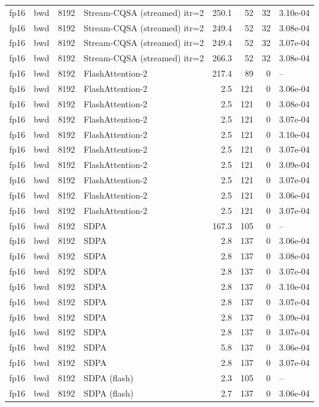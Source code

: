 \begin{tabular}{llrlrrrl}
fp16 & bwd & 8192 & Stream-CQSA (streamed) itr=2 & 250.1 & 52 & 32 & 3.10e-04 \\
fp16 & bwd & 8192 & Stream-CQSA (streamed) itr=2 & 249.4 & 52 & 32 & 3.08e-04 \\
fp16 & bwd & 8192 & Stream-CQSA (streamed) itr=2 & 249.4 & 52 & 32 & 3.07e-04 \\
fp16 & bwd & 8192 & Stream-CQSA (streamed) itr=2 & 266.3 & 52 & 32 & 3.08e-04 \\
fp16 & bwd & 8192 & FlashAttention-2 & 217.4 & 89 & 0 & -- \\
fp16 & bwd & 8192 & FlashAttention-2 & 2.5 & 121 & 0 & 3.06e-04 \\
fp16 & bwd & 8192 & FlashAttention-2 & 2.5 & 121 & 0 & 3.08e-04 \\
fp16 & bwd & 8192 & FlashAttention-2 & 2.5 & 121 & 0 & 3.07e-04 \\
fp16 & bwd & 8192 & FlashAttention-2 & 2.5 & 121 & 0 & 3.10e-04 \\
fp16 & bwd & 8192 & FlashAttention-2 & 2.5 & 121 & 0 & 3.07e-04 \\
fp16 & bwd & 8192 & FlashAttention-2 & 2.5 & 121 & 0 & 3.09e-04 \\
fp16 & bwd & 8192 & FlashAttention-2 & 2.5 & 121 & 0 & 3.07e-04 \\
fp16 & bwd & 8192 & FlashAttention-2 & 2.5 & 121 & 0 & 3.06e-04 \\
fp16 & bwd & 8192 & FlashAttention-2 & 2.5 & 121 & 0 & 3.07e-04 \\
fp16 & bwd & 8192 & SDPA & 167.3 & 105 & 0 & -- \\
fp16 & bwd & 8192 & SDPA & 2.8 & 137 & 0 & 3.06e-04 \\
fp16 & bwd & 8192 & SDPA & 2.8 & 137 & 0 & 3.08e-04 \\
fp16 & bwd & 8192 & SDPA & 2.8 & 137 & 0 & 3.07e-04 \\
fp16 & bwd & 8192 & SDPA & 2.8 & 137 & 0 & 3.10e-04 \\
fp16 & bwd & 8192 & SDPA & 2.8 & 137 & 0 & 3.07e-04 \\
fp16 & bwd & 8192 & SDPA & 2.8 & 137 & 0 & 3.09e-04 \\
fp16 & bwd & 8192 & SDPA & 2.8 & 137 & 0 & 3.07e-04 \\
fp16 & bwd & 8192 & SDPA & 5.8 & 137 & 0 & 3.06e-04 \\
fp16 & bwd & 8192 & SDPA & 2.8 & 137 & 0 & 3.07e-04 \\
fp16 & bwd & 8192 & SDPA (flash) & 2.3 & 105 & 0 & -- \\
fp16 & bwd & 8192 & SDPA (flash) & 2.7 & 137 & 0 & 3.06e-04 \\

\end{tabular}

